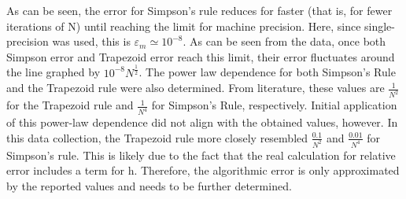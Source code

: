 \documentclass[aps,prb,groupedaddress,nofootinbib,floatfix]{revtex4}
\begin{document}
As can be seen, the error for Simpson's rule reduces for faster (that is, for fewer iterations of N) until reaching the limit for machine precision. Here, since single-precision was used, this is $\varepsilon_{m} \simeq 10^{-8}$. As can be seen from the data, once both Simpson error and Trapezoid error reach this limit, their error fluctuates around the line graphed by $10^{-8}N^{\frac{1}{2}}$. 
The power law dependence for both Simpson's Rule and the Trapezoid rule were also determined. From literature, these values are $\frac{1}{N^{2}}$ for the Trapezoid rule and $\frac{1}{N^{4}}$ for Simpson's Rule, respectively. Initial application of this power-law dependence did not align with the obtained values, however. In this data collection, the Trapezoid rule more closely resembled $\frac{0.1}{N^{2}}$ and $\frac{0.01}{N^{4}}$ for Simpson's rule. This is likely due to the fact that the real calculation for relative error includes a term for h. Therefore, the algorithmic error is only approximated by the reported values and needs to be further determined.
\end{document}
